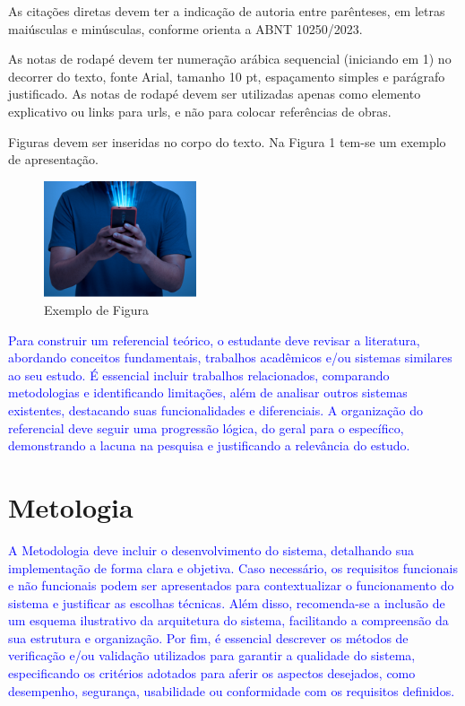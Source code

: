 \documentclass[a4paper,12pt]{article}
\begin{document}
As citações diretas devem ter a indicação de autoria entre parênteses, em letras
maiúsculas e minúsculas, conforme orienta a ABNT 10250/2023.

As notas de rodapé devem ter numeração arábica sequencial (iniciando em 1) no
decorrer do texto, fonte Arial, tamanho 10 pt, espaçamento simples e parágrafo
justificado. As notas de rodapé devem ser utilizadas apenas como elemento
explicativo ou links para urls, e não para colocar referências de obras.

Figuras devem ser inseridas no corpo do texto. Na Figura 1 tem-se um exemplo de
apresentação.

\begin{figure}[h]
    \centering
    \caption{Exemplo de Figura}
    \label{fig:figura}
    \includegraphics[width=0.4\textwidth]{imgs/fig.png}
\end{figure}

\textcolor{blue}{
Para construir um referencial teórico, o estudante deve revisar a literatura,
abordando conceitos fundamentais, trabalhos acadêmicos e/ou sistemas similares
ao seu estudo. É essencial incluir trabalhos relacionados, comparando
metodologias e identificando limitações, além de analisar outros sistemas
existentes, destacando suas funcionalidades e diferenciais. A organização do
referencial deve seguir uma progressão lógica, do geral para o específico,
demonstrando a lacuna na pesquisa e  justificando a relevância do estudo.
}

\section{Metologia}

\textcolor{blue}{
A Metodologia deve incluir o desenvolvimento do sistema, detalhando sua
implementação de forma clara e objetiva. Caso necessário, os requisitos
funcionais e não funcionais podem ser apresentados para contextualizar o
funcionamento do sistema e justificar as escolhas técnicas. Além disso,
recomenda-se a inclusão de um esquema ilustrativo da arquitetura do sistema,
facilitando a compreensão da sua estrutura e organização. Por fim, é essencial
descrever os métodos de verificação e/ou validação utilizados para garantir a
qualidade do sistema, especificando os critérios adotados para aferir os
aspectos desejados, como desempenho, segurança, usabilidade ou conformidade com
os requisitos definidos.
}
\end{document}
